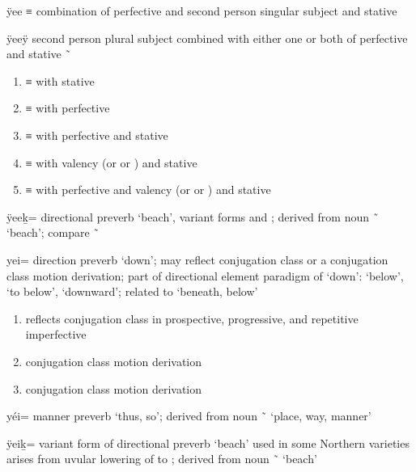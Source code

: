 \begin{morphdesc}[resume*=alphalist]
\item[ÿee]
	≡ 
	combination of perfective 
		and second person singular subject 
		and stative 

\item[ÿeeÿ]
	second person plural subject  combined with either one or both of
		perfective 
		and stative  \~\ 
	\begin{enumerate}
	\item	{} ≡ 
		with stative 
	\item	{} ≡ 
		with perfective 
	\item	{} ≡ 
		with perfective 
		and stative 
	\item	{} ≡ 
		with valency 
			(or   or  )
		and stative 
	\item	{} ≡ 
		with perfective 
		and valency 
			(or   or  )
		and stative 
	\end{enumerate}

\item[ÿeeḵ=]
	directional preverb ‘beach’, variant forms  and ;
	derived from noun  \~\  ‘beach’;
	compare  \~\ 

\item[yei=]
	direction preverb ‘down’;
	may reflect  conjugation class or a  conjugation class motion derivation;
	part of directional element paradigm of  ‘down’:
		 ‘below’,  ‘to below’,  ‘downward’;
	related to  ‘beneath, below’
	\begin{enumerate}
	\item	reflects  conjugation class in prospective, progressive, and repetitive imperfective
	\item	{} conjugation class motion derivation
	\item	{} conjugation class motion derivation
	\end{enumerate}

\item[yéi=]
	manner preverb ‘thus, so’;
	derived from noun  \~\  ‘place, way, manner’

\item[ÿeiḵ=]
	variant form of directional preverb  ‘beach’ used in some Northern varieties
	arises from uvular lowering of  to ;
	derived from noun  \~\  ‘beach’


\end{morphdesc}
